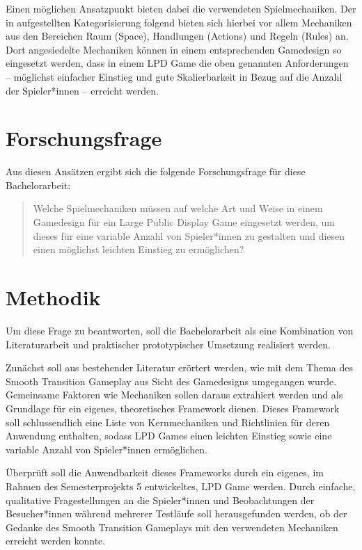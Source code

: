 Einen möglichen Ansatzpunkt bieten dabei die verwendeten Spielmechaniken. Der in \cite{Schell2019} aufgestellten Kategorisierung folgend bieten sich hierbei vor allem Mechaniken aus den Bereichen Raum (Space), Handlungen (Actions) und Regeln (Rules) an. Dort angesiedelte Mechaniken können in einem entsprechenden Gamedesign so eingesetzt werden, dass in einem LPD Game die oben genannten Anforderungen -- möglichst einfacher Einstieg und gute Skalierbarkeit in Bezug auf die Anzahl der Spieler*innen -- erreicht werden.


\section*{Forschungsfrage}

Aus diesen Ansätzen ergibt sich die folgende Forschungsfrage für diese Bachelorarbeit:
%
\begin{quote}
Welche Spielmechaniken müssen auf welche Art und Weise in einem Gamedesign für ein Large Public Display Game eingesetzt werden, um dieses für eine variable Anzahl von Spieler*innen zu gestalten und diesen einen möglichst leichten Einstieg zu ermöglichen?
\end{quote}


\section*{Methodik}

Um diese Frage zu beantworten, soll die Bachelorarbeit als eine Kombination von Literaturarbeit und praktischer \bzw prototypischer Umsetzung realisiert werden.

Zunächst soll aus bestehender Literatur %
erörtert werden, wie mit dem Thema des Smooth Transition Gameplay aus Sicht des Gamedesigns umgegangen wurde. Gemeinsame Faktoren wie Mechaniken sollen daraus extrahiert werden und als Grundlage für ein eigenes, theoretisches Framework dienen. Dieses Framework soll schlussendlich eine Liste von Kernmechaniken und Richtlinien für deren Anwendung enthalten, sodass LPD Games einen leichten Einstieg sowie eine variable Anzahl von Spieler*innen ermöglichen.

Überprüft soll die Anwendbarkeit dieses Frameworks durch ein eigenes, im Rahmen des Semesterprojekts 5 entwickeltes, LPD Game werden. Durch einfache, qualitative Fragestellungen an die Spieler*innen und Beobachtungen der Besucher*innen während mehrerer Testläufe soll herausgefunden werden, ob der Gedanke des Smooth Transition Gameplays mit den verwendeten Mechaniken erreicht werden konnte.


